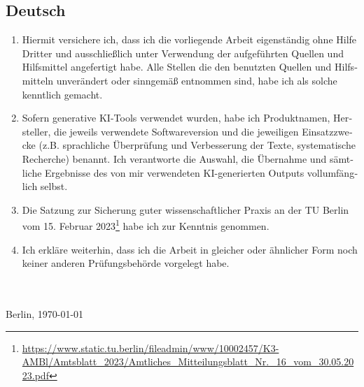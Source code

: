{\begin{otherlanguage}{ngerman}
\section*{Deutsch}
\begin{enumerate}[noitemsep]
\item Hiermit versichere ich, dass ich die vorliegende Arbeit eigenständig ohne Hilfe Dritter und ausschließlich unter Verwendung der aufgeführten Quellen und Hilfsmittel angefertigt habe. Alle Stellen die den benutzten Quellen und Hilfsmitteln unverändert oder sinngemäß entnommen sind, habe ich als solche kenntlich gemacht.
\item Sofern generative KI-Tools verwendet wurden, habe ich Produktnamen, Hersteller, die jeweils verwendete Softwareversion und die jeweiligen Einsatzzwecke (z.B. sprachliche Überprüfung und Verbesserung der Texte, systematische Recherche) benannt. Ich verantworte die Auswahl, die Übernahme und sämtliche Ergebnisse des von mir verwendeten KI-generierten Outputs vollumfänglich selbst.
\item Die Satzung zur Sicherung guter wissenschaftlicher Praxis an der TU Berlin vom 15. Februar 2023\footnote{\url{https://www.static.tu.berlin/fileadmin/www/10002457/K3-AMBl/Amtsblatt_2023/Amtliches_Mitteilungsblatt_Nr._16_vom_30.05.2023.pdf}} habe ich zur Kenntnis genommen.
\item Ich erkläre weiterhin, dass ich die Arbeit in gleicher oder ähnlicher Form noch keiner anderen Prüfungsbehörde vorgelegt habe.
\end{enumerate}
\vspace*{4ex}
\makebox[3in][l]{\hrulefill}\\
\textsc{\autor} \\
Berlin, \today 
\end{otherlanguage}
\pagebreak
\begin{otherlanguage}{english}

\end{otherlanguage}}
